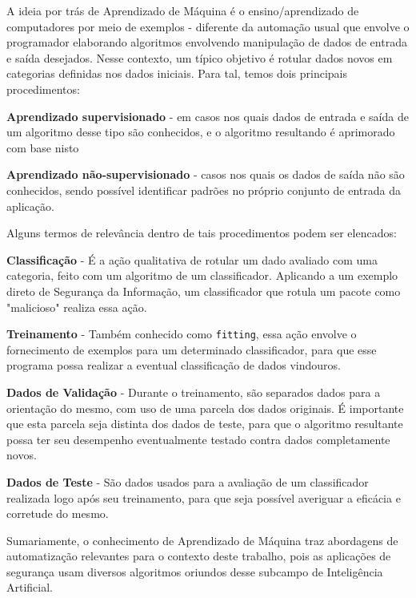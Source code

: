 A ideia por trás de Aprendizado de Máquina \cite{dantas_transformers_2021} é o ensino/aprendizado de computadores por meio de exemplos - diferente da automação usual que envolve o programador elaborando algoritmos envolvendo manipulação de dados de entrada e saída desejados. Nesse contexto, um típico objetivo é rotular dados novos em categorias definidas nos dados iniciais. Para tal, temos dois principais procedimentos:
\begin{alineas}
\item \textbf{Aprendizado supervisionado} - em casos nos quais dados de entrada e saída de um algoritmo desse tipo são conhecidos, e o algoritmo resultando é aprimorado com base nisto
\item \textbf{Aprendizado não-supervisionado} - casos nos quais os dados de saída não são conhecidos, sendo possível identificar padrões no próprio conjunto de entrada da aplicação.
\end{alineas}

Alguns termos de relevância dentro de tais procedimentos podem ser elencados:
\begin{alineas}
\item \textbf{Classificação} - É a ação qualitativa de rotular um dado avaliado com uma categoria, feito com um algoritmo de um classificador. Aplicando a um exemplo direto de Segurança da Informação, um classificador que rotula um pacote como "malicioso" realiza essa ação.
\item \textbf{Treinamento} - Também conhecido como \verb+fitting+, essa ação envolve o fornecimento de exemplos para um determinado classificador, para que esse programa possa realizar a eventual classificação de dados vindouros.
\item \textbf{Dados de Validação} - Durante o treinamento, são separados dados para a orientação do mesmo, com uso de uma parcela dos dados originais. É importante que esta parcela seja distinta dos dados de teste, para que o algoritmo resultante possa ter seu desempenho eventualmente testado contra dados completamente novos.
\item \textbf{Dados de Teste} - São dados usados para a avaliação de um classificador realizada logo após seu treinamento, para que seja possível averiguar a eficácia e corretude do mesmo.
\end{alineas}


Sumariamente, o conhecimento de Aprendizado de Máquina traz abordagens
de automatização relevantes para o contexto deste trabalho, pois as aplicações de segurança usam diversos algoritmos oriundos desse subcampo de
Inteligência Artificial.

